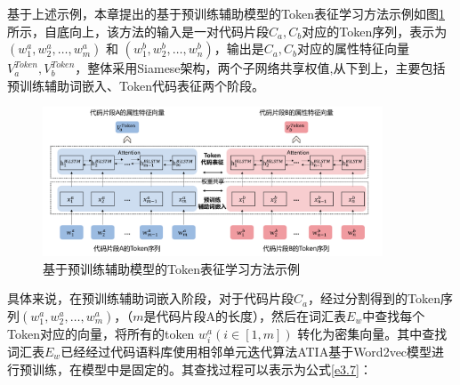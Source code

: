     

    

基于上述示例，本章提出的基于预训练辅助模型的Token表征学习方法示例如图\ref{fig:token}所示，自底向上，该方法的输入是一对代码片段$C_{a},C_{b}$对应的Token序列，表示为$\left( w_{1}^{a},w_{2}^{a},\ldots,w_{m}^{a}\right)$ 和 $\left( w_{1}^{b},w_{2}^{b},\ldots,w_{n}^{b} \right)$，输出是$C_{a},C_{b}$对应的属性特征向量 $V_{a}^{Token},V_{b}^{Token}$，整体采用Siamese架构，两个子网络共享权值,从下到上，主要包括预训练辅助词嵌入、Token代码表征两个阶段。
\begin{figure}[htp]
  \centering
  \includegraphics[width=0.9\textwidth]{figures/token}
  \caption{基于预训练辅助模型的Token表征学习方法示例}\label{fig:token}
\end{figure}

具体来说，在预训练辅助词嵌入阶段，对于代码片段$C_{a}$，经过分割得到的Token序列$\left( w_{1}^{a},w_{2}^{a},\ldots,w_{m}^{a}\right)$，（$m$是代码片段A的长度），然后在词汇表$E_{w}$中查找每个Token对应的向量，将所有的token $w_{i}^{a} \left(i \in [1,m]\right)$ 转化为密集向量。其中查找词汇表$E_{w}$已经经过代码语料库使用相邻单元迭代算法ATIA基于Word2vec模型进行预训练，在模型中是固定的。其查找过程可以表示为公式\ref{e3.7}：

